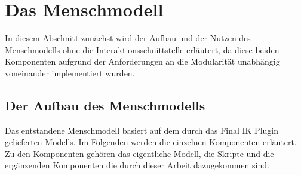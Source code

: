 \section{Das Menschmodell}\label{sec:DasMenschmodell}
In diesem Abschnitt zunächst wird der Aufbau und der Nutzen des Menschmodells ohne die Interaktionsschnittstelle erläutert, da diese beiden Komponenten aufgrund der Anforderungen an die Modularität unabhängig voneinander implementiert wurden.

\subsection{Der Aufbau des Menschmodells}\label{sec:MMAufbau}
Das entstandene Menschmodell basiert auf dem durch das Final IK Plugin gelieferten Modells. Im Folgenden werden die einzelnen Komponenten erläutert. Zu den Komponenten gehören das eigentliche Modell, die Skripte und die ergänzenden Komponenten die durch dieser Arbeit dazugekommen sind.

